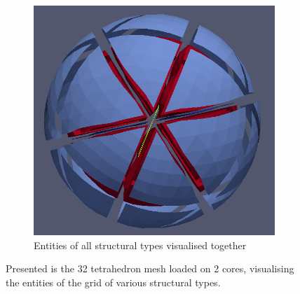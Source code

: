 \begin{figure}
	\begin{subfigure}[b]{0.46\textwidth} \vspace{5mm} \hspace{12mm} \includegraphics[scale=0.21]{images/32-full}  \captionsetup{width=0.6\textwidth} \caption{ Entities of all structural types visualised together } \end{subfigure}
	\caption{Presented is the 32 tetrahedron mesh loaded on 2 cores, visualising the entities of the grid of various structural types. }
	\label{fig:result:spherestruct}
\end{figure}


